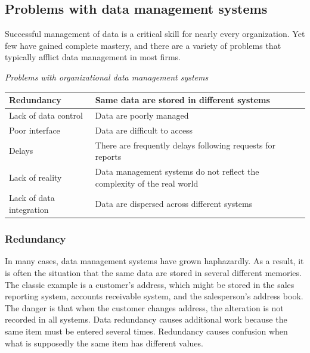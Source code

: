 \documentclass[
]{article}
\begin{document}
\hypertarget{problems-with-data-management-systems}{%
\subsection*{Problems with data management systems}\label{problems-with-data-management-systems}}

Successful management of data is a critical skill for nearly every
organization. Yet few have gained complete mastery, and there are a
variety of problems that typically afflict data management in most
firms.

\emph{Problems with organizational data management systems}

\begin{longtable}[]{@{}
  >{\raggedright\arraybackslash}p{}
  >{\raggedright\arraybackslash}p{}@{}}
\toprule
Redundancy & Same data are stored in different systems \\
\midrule
\endhead
Lack of data control & Data are poorly managed \\
Poor interface & Data are difficult to access \\
Delays & There are frequently delays following requests for reports \\
Lack of reality & Data management systems do not reflect the complexity of the real world \\
Lack of data integration & Data are dispersed across different systems \\
\bottomrule
\end{longtable}

\hypertarget{redundancy}{%
\subsubsection*{Redundancy}\label{redundancy}}

In many cases, data management systems have grown haphazardly. As a
result, it is often the situation that the same data are stored in
several different memories. The classic example is a customer's address,
which might be stored in the sales reporting system, accounts receivable
system, and the salesperson's address book. The danger is that when the
customer changes address, the alteration is not recorded in all systems.
Data redundancy causes additional work because the same item must be
entered several times. Redundancy causes confusion when what is
supposedly the same item has different values.
\end{document}
